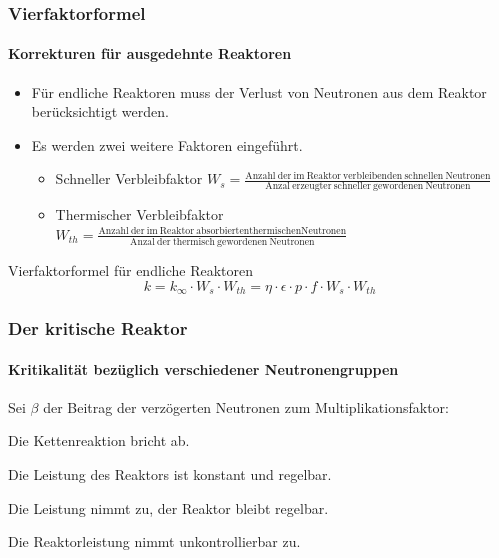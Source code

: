 \documentclass{beamer}[9pt]
\begin{document}
\begin{frame}
\frametitle{Vierfaktorformel}
\framesubtitle{Korrekturen für ausgedehnte Reaktoren}
\begin{itemize}
\item Für endliche Reaktoren muss der Verlust von Neutronen aus dem Reaktor berücksichtigt werden.
\item Es werden zwei weitere Faktoren eingeführt.
\begin{itemize}
\item Schneller Verbleibfaktor
\vspace{0.5em}
$
W_{s} = \frac{\mathrm{Anzahl\ der\ im\ Reaktor\ verbleibenden\ schnellen\ Neutronen}}{\mathrm{Anzal\ erzeugter\ schneller\ gewordenen\ Neutronen}}
$
\vspace{1em}
\item Thermischer Verbleibfaktor
$
W_{th} = \frac{\mathrm{Anzahl\ der\ im\ Reaktor\ absorbierten thermischen Neutronen}}{\mathrm{Anzal\ der\ thermisch\ gewordenen\ Neutronen}}
$
\end{itemize}
\end{itemize}
\begin{block}{Vierfaktorformel für endliche Reaktoren}
\[k
 = k_{\infty} \cdot W_s \cdot W_{th} = \eta\cdot\epsilon\cdot p\cdot f  \cdot W_s \cdot W_{th} 
\]
\end{block}
\end{frame}
\begin{frame}
\frametitle{Der kritische Reaktor}
\framesubtitle{Kritikalität bezüglich verschiedener Neutronengruppen}
Sei $\beta$ der Beitrag der verzögerten Neutronen zum Multiplikationsfaktor:
\begin{description}
\item[unterkritisch$(k < 0)$:] Die Kettenreaktion bricht ab. 
\item[verzögert kritisch$(k = 1)$:] Die Leistung des Reaktors ist konstant und regelbar.
\item[verzögert überkritisch$(1 < k < 1 + \beta)$:] Die Leistung nimmt zu, der Reaktor bleibt regelbar.
\item[prompt überkritisch$(k > 1+\beta)$:] Die Reaktorleistung nimmt unkontrollierbar zu.
\end{description}
\end{frame}
\end{document}
